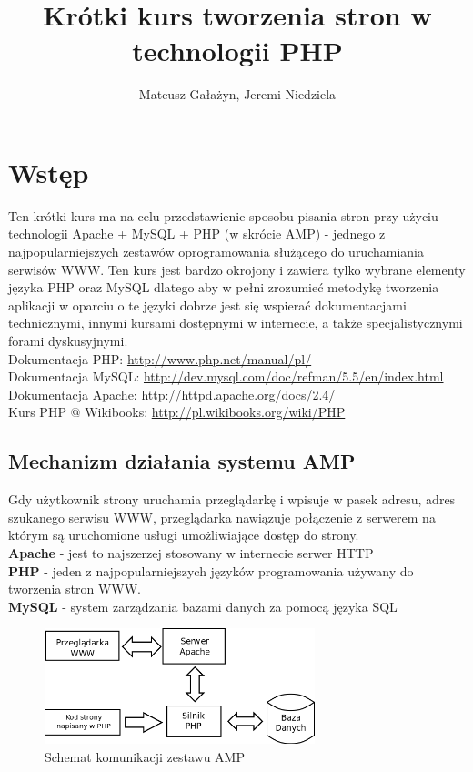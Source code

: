 \documentclass[a4paper,10pt]{article}
\author{Mateusz Gałażyn, Jeremi Niedziela}
\title{Krótki kurs tworzenia stron w technologii PHP}
\begin{document}
\pagestyle{fancy}


\maketitle
\section{Wstęp}
Ten krótki kurs ma na celu przedstawienie sposobu pisania stron przy użyciu technologii Apache + MySQL + PHP (w skrócie AMP) - jednego z najpopularniejszych zestawów oprogramowania służącego do uruchamiania serwisów WWW. Ten kurs jest bardzo okrojony i zawiera tylko wybrane elementy języka PHP oraz MySQL dlatego aby w pełni zrozumieć metodykę tworzenia aplikacji w oparciu o te  języki dobrze jest się wspierać dokumentacjami technicznymi, innymi kursami dostępnymi w internecie, a także specjalistycznymi forami dyskusyjnymi. \\
Dokumentacja PHP: \href{http://www.php.net/manual/pl/}{http://www.php.net/manual/pl/} \\
Dokumentacja MySQL: \href{http://dev.mysql.com/doc/refman/5.5/en/index.html}{http://dev.mysql.com/doc/refman/5.5/en/index.html} \\
Dokumentacja Apache: \href{http://httpd.apache.org/docs/2.4/}{http://httpd.apache.org/docs/2.4/} \\
Kurs PHP @ Wikibooks: \href{http://pl.wikibooks.org/wiki/PHP}{http://pl.wikibooks.org/wiki/PHP}

\subsection{Mechanizm działania systemu AMP} 
Gdy użytkownik strony uruchamia przeglądarkę i wpisuje w pasek adresu, adres szukanego serwisu WWW, przeglądarka nawiązuje połączenie z serwerem na którym są uruchomione usługi umożliwiające dostęp do strony. \\
\textbf{Apache} - jest to najszerzej stosowany w internecie serwer HTTP \\
\textbf{PHP} - jeden z najpopularniejszych języków programowania używany do tworzenia stron WWW. \\
\textbf{MySQL} - system zarządzania bazami danych za pomocą języka SQL \\


\begin{figure}[htbp]
\centering
\includegraphics[width=0.7\textwidth]{LAMP.png}
\caption{Schemat komunikacji zestawu AMP}
\end{figure}
\end{document}
